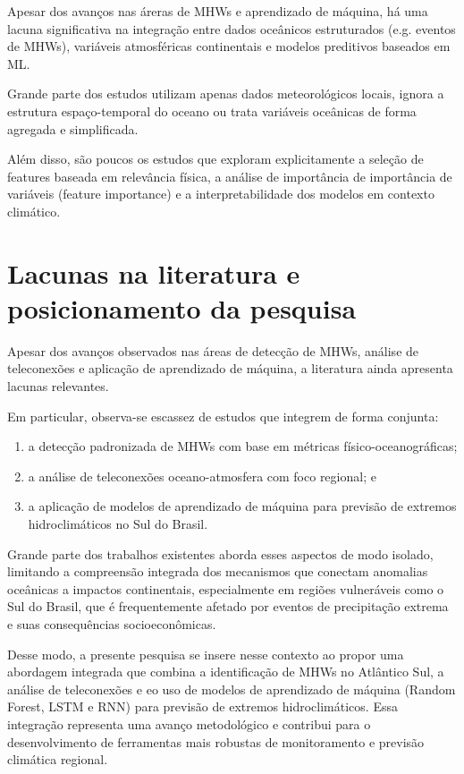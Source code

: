 	Apesar dos avanços nas áreras de MHWs e aprendizado de máquina, há uma lacuna significativa na integração entre dados oceânicos estruturados (e.g. eventos de MHWs), variáveis atmosféricas continentais e modelos preditivos baseados em ML.

	Grande parte dos estudos utilizam apenas dados meteorológicos locais, ignora a estrutura espaço-temporal do oceano ou trata variáveis oceânicas de forma agregada e simplificada.

	Além disso, são poucos os estudos que exploram explicitamente a seleção de features baseada em relevância física, a análise de importância de importância de variáveis (feature importance) e a interpretabilidade dos modelos em contexto climático.

\section{Lacunas na literatura e posicionamento da pesquisa}\label{sec:lacunas}

	Apesar dos avanços observados nas áreas de detecção de MHWs, análise de teleconexões e aplicação de aprendizado de máquina, a literatura ainda apresenta lacunas relevantes.

	Em particular, observa-se escassez de estudos que integrem de forma conjunta:
	
	\begin{enumerate}
		[label=(\roman*)]
		\item a detecção padronizada de MHWs com base em métricas físico-oceanográficas;
		\item a análise de teleconexões oceano-atmosfera com foco regional; e
		\item a aplicação de modelos de aprendizado de máquina para previsão de extremos hidroclimáticos no Sul do Brasil.
	\end{enumerate}

	Grande parte dos trabalhos existentes aborda esses aspectos de modo isolado, limitando a compreensão integrada dos mecanismos que conectam anomalias oceânicas a impactos continentais, especialmente em regiões vulneráveis como o Sul do Brasil, que é frequentemente afetado por eventos de precipitação extrema e suas consequências socioeconômicas.

	Desse modo, a presente pesquisa se insere nesse contexto ao propor uma abordagem integrada que combina a identificação de MHWs no Atlântico Sul, a análise de teleconexões e eo uso de modelos de aprendizado de máquina (Random Forest, LSTM e RNN) para previsão de extremos hidroclimáticos. 
	Essa integração representa uma avanço metodológico e contribui para o desenvolvimento de ferramentas mais robustas de monitoramento e previsão climática regional.



